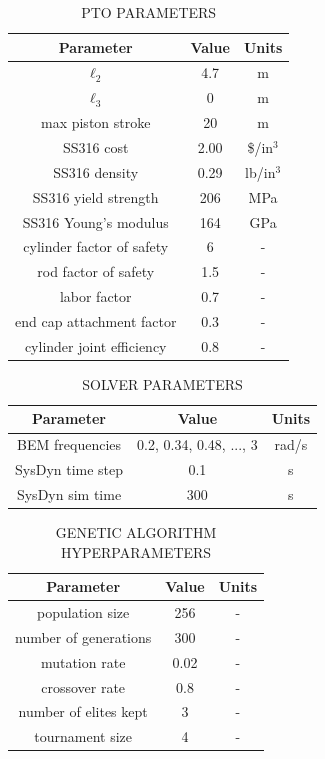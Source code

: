 \documentclass[twocolumn,10pt]{asme2e}
\begin{document}
\begin{table}[h]
    \centering
    \caption{PTO PARAMETERS}
    \begin{tabular}{ccc}
        \hline
        \textbf{Parameter} & \textbf{Value} & \textbf{Units} \\
        \hline
        $\ell_2$ & 4.7 & m \\
        $\ell_3$ & 0 & m \\
        max piston stroke & 20 & m \\
        SS316 cost & 2.00 \cite{316ss} & \$/in$^3$ \\
        SS316 density & 0.29 \cite{316ss} & lb/in$^3$ \\
        SS316 yield strength & 206 \cite{316ss} & MPa \\
        SS316 Young's modulus & 164 \cite{316ss} & GPa \\
        cylinder factor of safety & 6 & - \\
        rod factor of safety & 1.5 & - \\
        labor factor & 0.7 & - \\
        end cap attachment factor & 0.3 \cite{ASME_BPVC} & - \\
        cylinder joint efficiency & 0.8 \cite{ASME_BPVC} & - \\
        \hline
    \end{tabular}
    \label{tab:paramspto}
\end{table}

\begin{table}[h]
    \centering
    \caption{SOLVER PARAMETERS}
    \begin{tabular}{ccc}
        \hline
        \textbf{Parameter} & \textbf{Value} & \textbf{Units} \\
        \hline
        BEM frequencies & 0.2, 0.34, 0.48, ..., 3& rad/s \\
        SysDyn time step & 0.1 & s \\
        SysDyn sim time & 300 & s \\
        \hline
    \end{tabular}
    \label{tab:paramssolve}
\end{table}

\begin{table}[h]
    \centering
    \caption{GENETIC ALGORITHM HYPERPARAMETERS}
    \begin{tabular}{ccc}
        \hline
        \textbf{Parameter} & \textbf{Value} & \textbf{Units} \\
        \hline
        population size & 256 & - \\
        number of generations & 300 & - \\
        mutation rate & 0.02 & - \\
        crossover rate & 0.8 & - \\
        number of elites kept & 3 & - \\
        tournament size & 4 & - \\ 
        \hline
    \end{tabular}
    \label{tab:paramsga}
\end{table}
\end{document}
